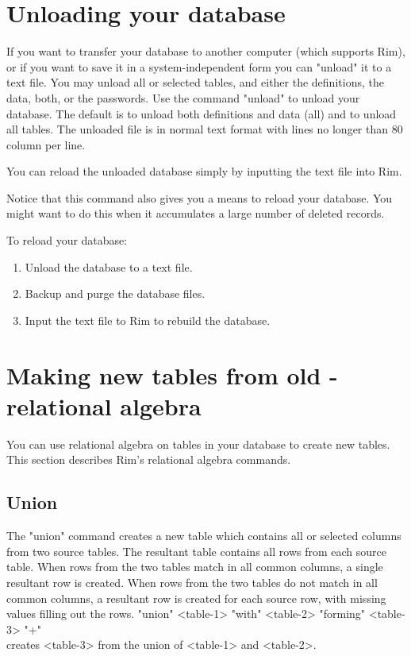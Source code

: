 \section{Unloading your database}
%
If you want to transfer your database to another computer (which
supports Rim), or if you want to save it in a system-inde\-pend\-ent
form you can "unload" it to a text file.  You may unload
all or selected tables, and either
the definitions, the data, both, or the passwords.
Use the command
\<"unload" 
    \>
to unload your database.  The default is to unload both definitions
and data (all) and to unload all tables.
The unloaded file is in normal text format with lines no longer
than 80 column per line.
 
You can reload the unloaded database simply by inputting the
text file into Rim.
 
\medskip
 
Notice that this command also gives you a means to reload your database.
You might want to do this when it accumulates a large number of deleted
records.
 
To reload your database:
\begin{enumerate}
\item Unload the database to a text file.
\item Backup and purge the database files.
\item Input the text file to Rim to rebuild the database.
\end{enumerate}
 
 
 
\section{Making new tables from old - relational algebra}
%
\label{ra-section}
 
You can use relational algebra on tables in your database
to create new tables. This section describes Rim's
relational algebra commands.
 
\subsection{Union}
%
The "union" command creates a new table which contains all
or selected columns from two source tables.  The resultant
table contains all rows from each source table.
When rows from the two tables
match in all common columns, a single resultant row is created.
When rows from the two tables do not
match in all common columns, a resultant row is created
for each source row, with missing values filling out the rows.
\<"union" <table-1> "with" <table-2> "forming" <table-3> "+"\\
  \qquad  {}\>
creates <table-3> from the union of <table-1> and <table-2>.
 
